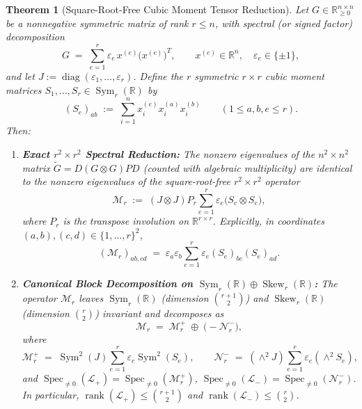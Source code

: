 \documentclass[11pt,a4paper]{article}
\theoremstyle{plain}
\newtheorem{theorem}{Theorem}[section]
\theoremstyle{definition}
\theoremstyle{remark}
\DeclareMathOperator{\Spec}{Spec}
\DeclareMathOperator{\Sym}{Sym}
\DeclareMathOperator{\Skew}{Skew}
\DeclareMathOperator{\diag}{diag}
\DeclareMathOperator{\rank}{rank}
\begin{document}
\begin{theorem}[Square-Root-Free Cubic Moment Tensor Reduction]\label{thm:cubic}
Let $G \in \mathbb{R}_{\ge 0}^{n \times n}$ be a nonnegative symmetric matrix of rank $r \le n$, with spectral (or signed factor) decomposition
\begin{equation}\label{eq:G_rank_r}
  G \;=\; \sum_{e=1}^r \varepsilon_e \, x^{(e)} \big(x^{(e)}\big)^T, \qquad x^{(e)} \in \mathbb{R}^n, \quad \varepsilon_e \in \{\pm 1\},
\end{equation}
and let $J := \diag(\varepsilon_1,\dots,\varepsilon_r)$. Define the $r$ symmetric $r \times r$ \emph{cubic moment matrices} $S_1,\dots,S_r \in \Sym_r(\mathbb{R})$ by
\begin{equation}\label{eq:Se_def}
  (S_e)_{ab} \;:=\; \sum_{i=1}^n x_i^{(e)} x_i^{(a)} x_i^{(b)} \qquad (1 \le a,b,e \le r).
\end{equation}
Then:
\begin{enumerate}[label=(\alph*)]
  \item \textbf{Exact $r^2 \times r^2$ Spectral Reduction:} The nonzero eigenvalues of the $n^2 \times n^2$ matrix $\widetilde{G} = D(G \otimes G)PD$ (counted with algebraic multiplicity) are identical to the nonzero eigenvalues of the square-root-free $r^2 \times r^2$ operator
  \begin{equation}\label{eq:Mr}
    \mathcal{M}_r \;:=\; (J \otimes J) P_r \sum_{e=1}^r \varepsilon_e \big(S_e \otimes S_e\big),
  \end{equation}
  where $P_r$ is the transpose involution on $\mathbb{R}^{r \times r}$. Explicitly, in coordinates $(a,b), (c,d) \in \{1,\dots,r\}^2$,
  \[
    (\mathcal{M}_r)_{ab,cd} \;=\; \varepsilon_a \varepsilon_b \sum_{e=1}^r \varepsilon_e (S_e)_{bc} (S_e)_{ad}.
  \]
  \item \textbf{Canonical Block Decomposition on $\Sym_r(\mathbb{R}) \oplus \Skew_r(\mathbb{R})$:} The operator $\mathcal{M}_r$ leaves $\Sym_r(\mathbb{R})$ (dimension $\binom{r+1}{2}$) and $\Skew_r(\mathbb{R})$ (dimension $\binom{r}{2}$) invariant and decomposes as
  \begin{equation}\label{eq:Mr_blocks}
    \mathcal{M}_r \;=\; \mathcal{M}_r^+ \;\oplus\; \big(-\mathcal{N}_r^-\big),
  \end{equation}
  where
  \begin{equation}\label{eq:Mr_plus_minus}
    \mathcal{M}_r^+ \;=\; \Sym^2(J) \sum_{e=1}^r \varepsilon_e \Sym^2(S_e), \qquad \mathcal{N}_r^- \;=\; (\wedge^2 J) \sum_{e=1}^r \varepsilon_e (\wedge^2 S_e),
  \end{equation}
  and $\Spec_{\ne 0}(\mathcal{L}_+) = \Spec_{\ne 0}(\mathcal{M}_r^+)$, $\Spec_{\ne 0}(\mathcal{L}_-) = \Spec_{\ne 0}(\mathcal{N}_r^-)$. In particular, $\rank(\mathcal{L}_+) \le \binom{r+1}{2}$ and $\rank(\mathcal{L}_-) \le \binom{r}{2}$.
\end{enumerate}
\end{theorem}
\end{document}

